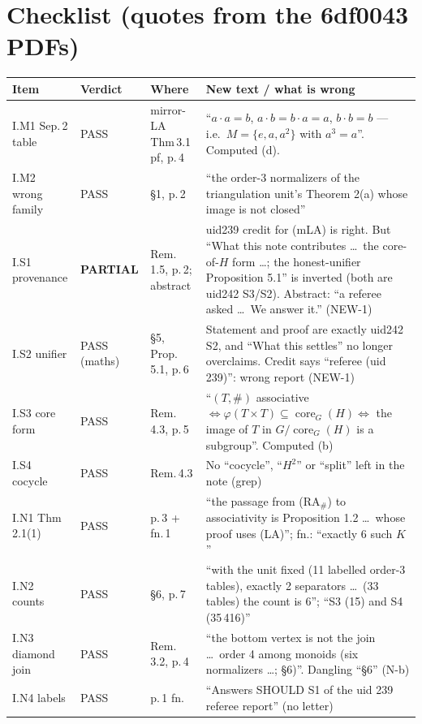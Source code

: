 \documentclass[11pt]{article}
\newcommand{\core}{\operatorname{core}}
\begin{document}
\section*{Checklist (quotes from the 6df0043 PDFs)}
{\footnotesize
\begin{tabularx}{\linewidth}{@{}>{\raggedright\arraybackslash}p{2.3cm}>{\raggedright\arraybackslash}p{1.75cm}>{\raggedright\arraybackslash}p{2.45cm}>{\raggedright\arraybackslash}X@{}}
\toprule
Item & Verdict & Where & New text / what is wrong\\
\midrule
I.M1 Sep.\,2 table & PASS & mirror-LA Thm\,3.1 pf, p.\,4 & ``$a\cdot a=b$, $a\cdot b=b\cdot a=a$, $b\cdot b=b$ --- i.e.\ $M=\{e,a,a^2\}$ with $a^3=a$''. Computed (d).\\
I.M2 wrong family & PASS & \S1, p.\,2 & ``the order-3 normalizers of the triangulation unit's Theorem 2(a) whose image is not closed''\\
I.S1 provenance & \textbf{PARTIAL} & Rem.\,1.5, p.\,2; abstract & uid239 credit for (mLA) is right. But ``What this note contributes \dots\ the core-of-$H$ form \dots; the honest-unifier Proposition 5.1'' is inverted (both are uid242 S3/S2). Abstract: ``a referee asked \dots\ We answer it.'' (NEW-1)\\
I.S2 unifier & PASS (maths) & \S5, Prop.\,5.1, p.\,6 & Statement and proof are exactly uid242 S2, and ``What this settles'' no longer overclaims. Credit says ``referee (uid 239)'': wrong report (NEW-1)\\
I.S3 core form & PASS & Rem.\,4.3, p.\,5 & ``$(T,\#)$ associative $\iff\varphi(T\times T)\subseteq\core_G(H)\iff$ the image of $T$ in $G/\core_G(H)$ is a subgroup''. Computed (b)\\
I.S4 cocycle & PASS & Rem.\,4.3 & No ``cocycle'', ``$H^2$'' or ``split'' left in the note (grep)\\
I.N1 Thm\,2.1(1) & PASS & p.\,3 + fn.\,1 & ``the passage from (RA$_\#$) to associativity is Proposition 1.2 \dots\ whose proof uses (LA)''; fn.: ``exactly 6 such $K$''\\
I.N2 counts & PASS & \S6, p.\,7 & ``with the unit fixed (11 labelled order-3 tables), exactly 2 separators \dots\ (33 tables) the count is 6''; ``S3 (15) and S4 (35\,416)''\\
I.N3 diamond join & PASS & Rem.\,3.2, p.\,4 & ``the bottom vertex is not the join \dots\ order 4 among monoids (six normalizers \dots; \S6)''. Dangling ``\S6'' (N-b)\\
I.N4 labels & PASS & p.\,1 fn. & ``Answers SHOULD S1 of the uid 239 referee report'' (no letter)\\

\end{tabularx}}
\end{document}
